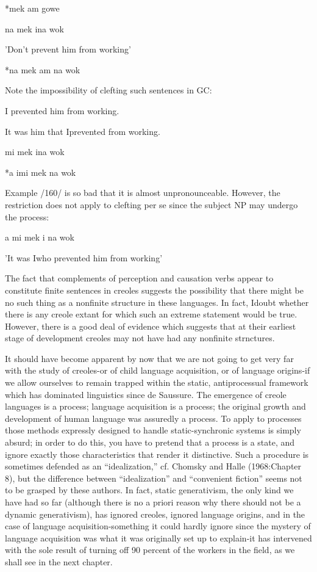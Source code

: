 \ea\label{ex:154}
 *mek am gowe
\glt
\z

\ea\label{ex:155}
 na mek ina wok
\glt
\z

'Don't prevent him from working'


\ea\label{ex:156}
 *na mek am na wok
\glt
\z

Note the impossibility of clefting such sentences in GC:

\ea\label{ex:157}
 I prevented him from working.
\glt
\z


\ea\label{ex:158}
 It was him that Iprevented from working.
\glt
\z

\ea\label{ex:159}
 mi mek ina wok
\glt
\z

\ea\label{ex:160}
 *a imi mek na wok
\glt
\z

Example /160/ is so bad that it is almost unpronounceable. However, the restriction does not apply to clefting per se since the subject NP may undergo the process:

\ea\label{ex:161}
 a mi mek i na wok
\glt
\z

'It was Iwho prevented him from working'

The fact that complements of perception and causation verbs appear to constitute finite sentences in creoles suggests the possibility that there might be no such thing as a nonfinite structure in these languages. In fact, Idoubt whether there is any creole extant for which such an extreme statement would be true. However, there is a good deal of evidence which suggests that at their earliest stage of develop\-ment creoles may not have had any nonfinite strnctures.

It should have become apparent by now that we are not going to get very far with the study of creoles-or of child language acquisition, or of language origins-if we allow ourselves to remain trapped within the static, antiprocessual framework which has dominated linguistics since de Saussure. The emergence of creole languages is a process; language acquisition is a process; the original growth and development of human language was assuredly a process. To apply to processes those methods expressly designed to handle static-synchronic systems is simply absurd; in order to do this, you have to pretend that a process
is a state, and ignore exactly those characteristics that render it distinc\-tive. Such a procedure is sometimes defended as an ``idealization,'' cf. Chomsky and Halle (1968:Chapter 8), but the difference between ``idealization'' and ``convenient fiction'' seems not to be grasped by these authors. In fact, static generativism, the only kind we have had so far (although there is no a priori reason why there should not be a dynamic generativism), has ignored creoles, ignored language origins, and in the case of language acquisition-something it could hardly ignore since the mystery of language acquisition was what it was originally set up to explain-it has intervened with the sole result of turning off 90 percent of the workers in the field, as we shall see in the next chapter.

